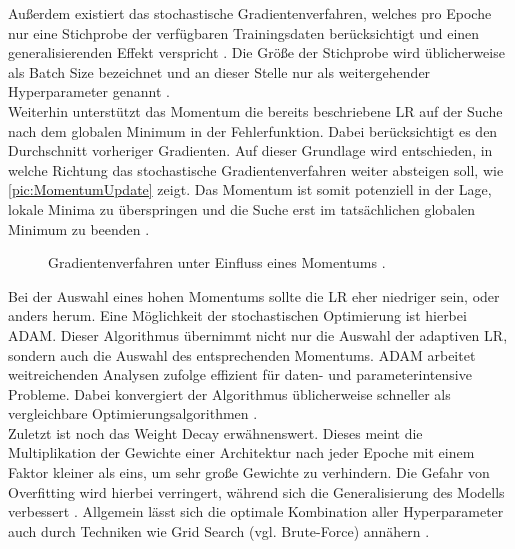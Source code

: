 \noindent
Außerdem existiert das stochastische Gradientenverfahren, welches pro Epoche nur eine Stichprobe der verfügbaren Trainingsdaten berücksichtigt und einen generalisierenden Effekt verspricht \cite[S.~437]{ZHA20}. Die Größe der Stichprobe wird üblicherweise als Batch Size bezeichnet und an dieser Stelle nur als weitergehender Hyperparameter genannt \cite[S.~446]{ZHA20}.\\

\noindent
Weiterhin unterstützt das Momentum die bereits beschriebene \ac{LR} auf der Suche nach dem globalen Minimum in der Fehlerfunktion. Dabei berücksichtigt es den Durchschnitt vorheriger Gradienten. Auf dieser Grundlage wird entschieden, in welche Richtung das stochastische Gradientenverfahren weiter absteigen soll, wie \autoref{pic:MomentumUpdate} zeigt. Das Momentum ist somit potenziell in der Lage, lokale Minima zu überspringen und die Suche erst im tatsächlichen globalen Minimum zu beenden \cite[S.~453-456]{ZHA20}.\\

\begin{figure}[h!]
  \centering
  \caption{Gradientenverfahren unter Einfluss eines Momentums \cite{CSNOJ}.}
  \label{pic:MomentumUpdate}
\end{figure}

\noindent
Bei der Auswahl eines hohen Momentums sollte die \ac{LR} eher niedriger sein, oder anders herum. Eine Möglichkeit der stochastischen Optimierung ist hierbei \ac{ADAM}. Dieser Algorithmus übernimmt nicht nur die Auswahl der adaptiven \ac{LR}, sondern auch die Auswahl des entsprechenden Momentums. \ac{ADAM} arbeitet weitreichenden Analysen zufolge effizient für daten- und parameterintensive Probleme. Dabei konvergiert der Algorithmus üblicherweise schneller als vergleichbare Optimierungsalgorithmen \cite[S.~1-2]{KIN17}.\\

\noindent
Zuletzt ist noch das Weight Decay erwähnenswert. Dieses meint die Multiplikation der Gewichte einer Architektur nach jeder Epoche mit einem Faktor kleiner als eins, um sehr große Gewichte zu verhindern. Die Gefahr von Overfitting wird hierbei verringert, während sich die Generalisierung des Modells verbessert \cite[S.~154]{ZHA20}. Allgemein lässt sich die optimale Kombination aller Hyperparameter auch durch Techniken wie Grid Search (vgl. Brute-Force) annähern \cite[S.~24]{YAN20}.


